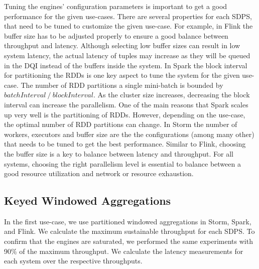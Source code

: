 Tuning the engines' configuration parameters is important to get a good performance for the given use-cases. %
There are several properties for each SDPS, that need to be tuned to customize the given use-case. For example, in Flink the buffer size has to be adjusted properly to ensure a good balance between throughput and latency. Although selecting low buffer sizes can result in low system latency, the actual latency of tuples may increase as they will be queued in the DQI instead of the buffers inside the system. In Spark the block interval for partitioning the RDDs is one key aspect to tune the system for the given use-case. The number of RDD partitions a single mini-batch  is bounded by $batchInterval \ / \ blockInterval$. As the cluster size increases, decreasing the block interval can increase the parallelism. One of the main reasons that Spark scales up very well is the partitioning of RDDs. However, depending on the use-case, the optimal number of RDD partitions can change. In Storm the number of workers, executors and buffer size are the the configurations (among many other) that needs to be tuned to get the best performance. Similar to Flink, choosing the buffer size is a key to balance between latency and throughput. For all systems,  choosing the right parallelism level is essential to balance between a good resource utilization and network or resource exhaustion.




\subsection{Keyed Windowed Aggregations}

In the first use-case, we use parti\-tioned  windowed aggregations in Storm, Spark, and Flink. We calculate the maximum sustainable  throughput for  each SDPS. To confirm that the engines are saturated, we performed the same experiments with 90\% of the maximum throughput. We calculate the latency measurements for each system over the respective throughputs.  

